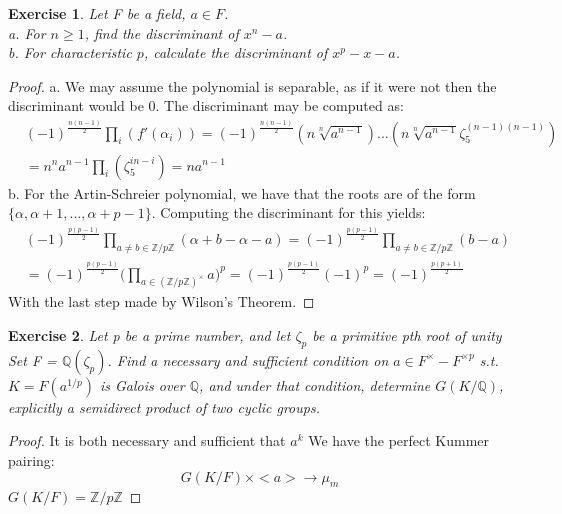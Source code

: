 \documentclass{article}
\newcommand{\bb}[1]{\mathbb{#1}}
\newtheorem{exercise}{Exercise}
\begin{document}
\begin{exercise}
  Let F be a field, $a \in F$. \\
  a. For $n \geq 1$, find the discriminant of $x^{n}-a$. \\
  b. For characteristic $p$, calculate the discriminant of $x^{p}-x-a$. 
\end{exercise}
\begin{proof}
  a. We may assume the polynomial is separable, as if it were not then the discriminant would be 0. The discriminant may be computed as:
  \begin{align*}
    & (-1)^{\frac{n(n-1)}{2}}\prod_{i}(f'(\alpha_{i})) = (-1)^{\frac{n(n-1)}{2}}(n\sqrt[n]{a^{n-1}})...(n\sqrt[n]{a^{n-1}}\zeta_{5}^{(n-1)(n-1)}) \\
    &= n^{n}a^{n-1}\prod_{i}(\zeta_{5}^{in-i}) = na^{n-1}  
    \end{align*}
    b. For the Artin-Schreier polynomial, we have that the roots are of the form $\{\alpha, \alpha + 1, ..., \alpha + p-1 \}$. Computing the discriminant for this yields:
    \begin{align*}
      & (-1)^{\frac{p(p-1)}{2}}\prod_{a \neq b \in \bb{Z}/p\bb{Z}}(\alpha + b - \alpha - a) = (-1)^{\frac{p(p-1)}{2}}\prod_{a \neq b \in \bb{Z}/p\bb{Z}}(b - a) \\
      & = (-1)^{\frac{p(p-1)}{2}}\Bigg(\prod_{a \in (\bb{Z}/p\bb{Z})^{\times}}a \Bigg)^{p} = (-1)^{\frac{p(p-1)}{2}}(-1)^{p} = (-1)^{\frac{p(p+1)}{2}} 
    \end{align*}
    With the last step made by Wilson's Theorem. 
  \end{proof}
  \newpage 
  \begin{exercise}
    Let p be a prime number, and let $\zeta_{p}$ be a primitive pth root of unity  Set F = $\bb{Q}(\zeta_{p})$. Find a necessary and sufficient condition on $a \in F^{\times} - F^{\times p}$ s.t. $K = F(a^{1/p})$ is Galois over $\bb{Q}$, and under that condition, determine $G(K/\bb{Q})$, explicitly a semidirect product of two cyclic groups. 
  \end{exercise}
  \begin{proof}
    It is both necessary and sufficient that $a^{k}$  We have the perfect Kummer pairing:
    \[
      G(K/F) \times <a> \to \mu_{m}
      \]
    $G(K/F) = \bb{Z}/p\bb{Z}$
  \end{proof}
\end{document}
